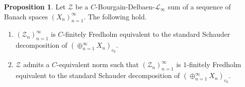 \documentclass[11pt]{amsart}
\theoremstyle{definition}
\newtheorem{proposition}[theorem]{Proposition}
\numberwithin{equation}{section}
\begin{document}
\begin{proposition}
\label{BD sum finitely fredholm equivalent to c0 sum}
Let $\mathcal{Z}$ be a $C$-Bourgain-Delbaen-$\mathscr{L}_\infty$ sum of a sequence of Banach spaces $(X_n)_{n=1}^\infty$. The following hold.
\begin{enumerate}[label=(\roman*),leftmargin=19pt]
    
    \item\label{BD sum finitely fredholm equivalent to c0 sum-i} $(\mathcal{Z}_n)_{n=1}^\infty$ is $C$-finitely Fredholm equivalent to the standard Schauder decomposition of $(\oplus_{n=1}^\infty X_n)_{c_0}$.

    \item\label{BD sum finitely fredholm equivalent to c0 sum-ii} $\mathcal{Z}$ admits a $C$-equivalent norm such that $(\mathcal{Z}_n)_{n=1}^\infty$ is $1$-finitely Fredholm equivalent to the standard Schauder decomposition of $(\oplus_{n=1}^\infty X_n)_{c_0}$.
    
\end{enumerate}


\end{proposition}
\end{document}
